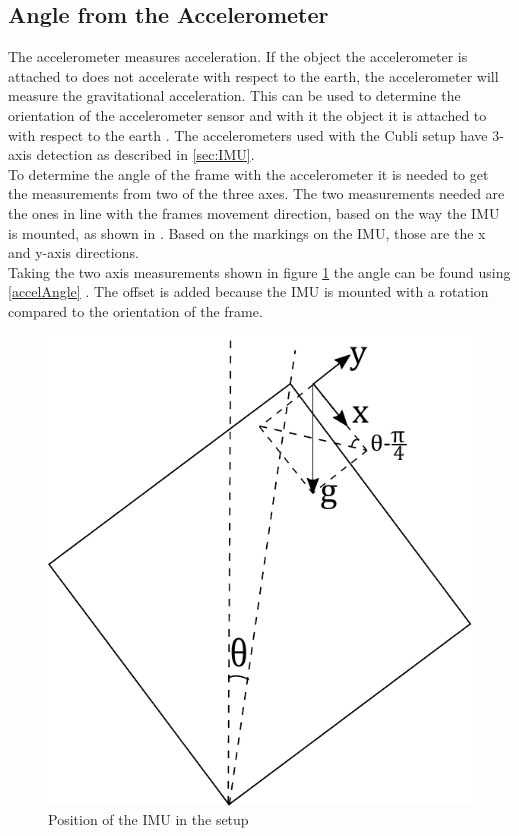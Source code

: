 \subsection{Angle from the Accelerometer}
The accelerometer measures acceleration. If the object the accelerometer is attached to does not accelerate with respect to the earth, the accelerometer will measure the gravitational acceleration. This can be used to determine the orientation of the accelerometer sensor and with it the object it is attached to with respect to the earth \cite{JWarren}. The accelerometers used with the Cubli setup have 3-axis detection as described in \ref{sec:IMU}. \\
To determine the angle of the frame with the accelerometer it is needed to get the measurements from two of the three axes. The two measurements needed are the ones in line with the frames movement direction, based on the way the IMU is mounted, as shown in . Based on the markings on the IMU, those are the x and y-axis directions.\\
Taking the two axis measurements shown in figure \ref{accelerometer} the angle can be found using \eqref{accelAngle} \cite{CFisher}. The offset is added because the IMU is mounted with a \si{} rotation compared to the orientation of the frame.
\begin{figure}[H]
	\centering
	\includegraphics[scale=0.5]{figures/accelerometer}
	\caption{Position of the IMU in the setup}
	\label{accelerometer}
\end{figure}\vspace{-5mm}
